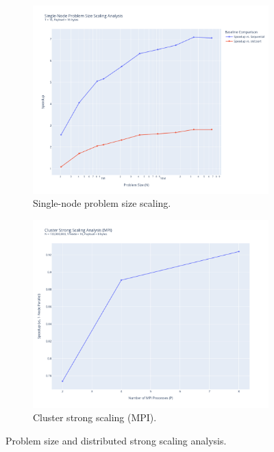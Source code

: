 \documentclass[10pt]{article}
\begin{document}
\begin{figure}[H]
    \centering
    \begin{subfigure}{0.49\textwidth}
        \includegraphics[width=\linewidth]{../python/plots/weak_scaling.pdf}
        \caption{Single-node problem size scaling.}
        \label{fig:problem_size_scaling}
    \end{subfigure}
    \hfill
    \begin{subfigure}{0.49\textwidth}
        \includegraphics[width=\linewidth]{../python/plots/cluster_scaling.pdf}
        \caption{Cluster strong scaling (MPI).}
        \label{fig:cluster_strong_scaling}
    \end{subfigure}
    \caption{Problem size and distributed strong scaling analysis.}
    \label{fig:size_and_strong_scaling}
\end{figure}
\end{document}
